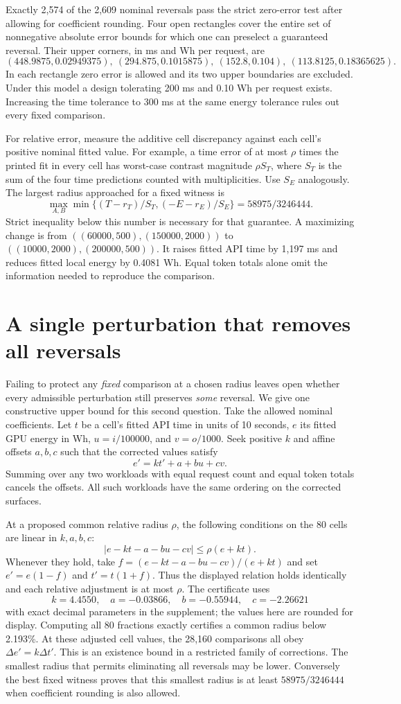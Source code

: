 \documentclass[11pt]{article}
\begin{document}
Exactly 2,574 of the 2,609 nominal reversals pass the strict zero-error test after allowing for coefficient rounding. Four open rectangles cover the entire set of nonnegative absolute error bounds for which one can preselect a guaranteed reversal. Their upper corners, in ms and Wh per request, are
\[
(448.9875,0.02949375),\ (294.875,0.1015875),\
(152.8,0.104),\ (113.8125,0.18365625).
\]
In each rectangle zero error is allowed and its two upper boundaries are excluded. Under this model a design tolerating 200 ms and 0.10 Wh per request exists. Increasing the time tolerance to 300 ms at the same energy tolerance rules out every fixed comparison.

For relative error, measure the additive cell discrepancy against each cell's positive nominal fitted value. For example, a time error of at most $\rho$ times the printed fit in every cell has worst-case contrast magnitude $\rho S_T$, where $S_T$ is the sum of the four time predictions counted with multiplicities. Use $S_E$ analogously. The largest radius approached for a fixed witness is
\[
 \max_{A,B}\min\{(T-r_T)/S_T,(-E-r_E)/S_E\}
 =58975/3246444 .
\]
Strict inequality below this number is necessary for that guarantee. A maximizing change is from $((60000,500),(150000,2000))$ to $((10000,2000),(200000,500))$. It raises fitted API time by 1,197 ms and reduces fitted local energy by 0.4081 Wh. Equal token totals alone omit the information needed to reproduce the comparison.
\newpage
\section*{A single perturbation that removes all reversals}
Failing to protect any \emph{fixed} comparison at a chosen radius leaves open whether every admissible perturbation still preserves \emph{some} reversal. We give one constructive upper bound for this second question. Take the allowed nominal coefficients. Let $t$ be a cell's fitted API time in units of 10 seconds, $e$ its fitted GPU energy in Wh, $u=i/100000$, and $v=o/1000$. Seek positive $k$ and affine offsets $a,b,c$ such that the corrected values satisfy
\[
 e'=kt'+a+bu+cv .
\]
Summing over any two workloads with equal request count and equal token totals cancels the offsets. All such workloads have the same ordering on the corrected surfaces.

At a proposed common relative radius $\rho$, the following conditions on the 80 cells are linear in $k,a,b,c$:
\[
 |e-kt-a-bu-cv|\le \rho(e+kt).
\]
Whenever they hold, take $f=(e-kt-a-bu-cv)/(e+kt)$ and set $e'=e(1-f)$ and $t'=t(1+f)$. Thus the displayed relation holds identically and each relative adjustment is at most $\rho$. The certificate uses
\[
 k=4.4550,\quad a=-0.03866,\quad b=-0.55944,\quad c=-2.26621
\]
with exact decimal parameters in the supplement; the values here are rounded for display. Computing all 80 fractions exactly certifies a common radius below 2.193\%. At these adjusted cell values, the 28,160 comparisons all obey $\Delta e'=k\Delta t'$. This is an existence bound in a restricted family of corrections. The smallest radius that permits eliminating all reversals may be lower. Conversely the best fixed witness proves that this smallest radius is at least $58975/3246444$ when coefficient rounding is also allowed.
\end{document}
